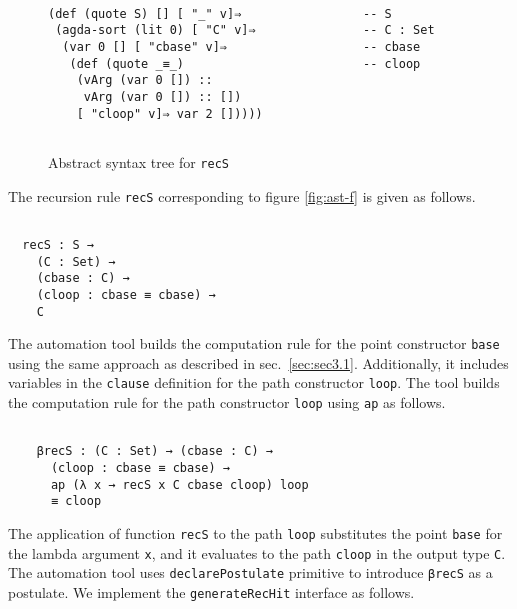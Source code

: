 \documentclass[sigplan,10pt]{acmart}
\begin{document}
\begin{figure}
\begin{center}
\begingroup
\fontsize{7pt}{9pt}\selectfont
\begin{Verbatim}[frame = single]

(def (quote S) [] [ "_" v]⇒                 -- S
 (agda-sort (lit 0) [ "C" v]⇒               -- C : Set
  (var 0 [] [ "cbase" v]⇒                   -- cbase
   (def (quote _≡_)                         -- cloop
    (vArg (var 0 []) ::
     vArg (var 0 []) :: [])
    [ "cloop" v]⇒ var 2 []))))
    
\end{Verbatim}
\endgroup
\end{center}
\caption{Abstract syntax tree for {\tt recS}}
\label{fig:ast-f}
\end{figure}

The recursion rule {\tt recS} corresponding to figure \eqref{fig:ast-f} is given as follows.

\begin{center}
\begingroup
\begin{BVerbatim}

  recS : S → 
    (C : Set) →
    (cbase : C) →
    (cloop : cbase ≡ cbase) →
    C

\end{BVerbatim}
\endgroup
\end{center}

The automation tool builds the computation rule for the point constructor {\tt base} using the same approach as described in sec.~\ref{sec:sec3.1}. Additionally, it includes variables in the {\tt clause} definition for the path constructor {\tt loop}. The tool builds the computation rule for the path constructor {\tt loop} using {\tt ap} as follows.

\begin{center}
\begingroup
\begin{BVerbatim}

    βrecS : (C : Set) → (cbase : C) → 
      (cloop : cbase ≡ cbase) → 
      ap (λ x → recS x C cbase cloop) loop 
      ≡ cloop
\end{BVerbatim}
\endgroup
\end{center}

The application of function {\tt recS} to the path {\tt loop} substitutes the point {\tt base} for the lambda argument {\tt x}, and it evaluates to the path {\tt cloop} in the output type {\tt C}. The automation tool uses {\tt declarePostulate} primitive to introduce {\tt βrecS} as a postulate. We implement the {\tt generateRecHit} interface as follows.
\end{document}
